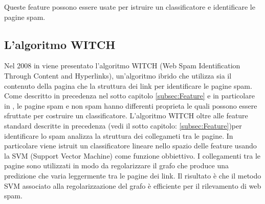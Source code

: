 Queste feature possono essere usate per istruire un classificatore e identificare le pagine spam.

\subsection{L'algoritmo WITCH}
Nel 2008 in \cite{Abernethy:2008:WSI:1451983.1451994} viene presentato  l'algoritmo WITCH (Web Spam Identification Through Content and Hyperlinks), un'algoritmo ibrido che utilizza sia il contenuto della pagina che la struttura dei link per identificare le pagine spam. Come descritto in precedenza nel sotto capitolo \ref{subsec:Feature} e in particolare in \cite{Ntoulas:2006:DSW:1135777.1135794}, le pagine spam e non spam hanno differenti proprieta le quali possono essere sfruttate per costruire un classificatore. L'algoritmo WITCH oltre alle feature standard descritte in precedenza (vedi il sotto capitolo: \ref{subsec:Feature})per identificare lo spam analizza la struttura dei collegameti tra le pagine. In particolare viene istruit un classificatore lineare nello spazio delle feature usando la SVM (Support Vector Machine) come funzione obbiettivo. I collegamenti tra le pagine sono utilizzati in modo da regolarizzare il grafo che produce una predizione che varia leggermente tra le pagine dei link. Il risultato è che il metodo SVM associato alla regolarizzazione del grafo è efficiente per il rilevamento di web spam. 

